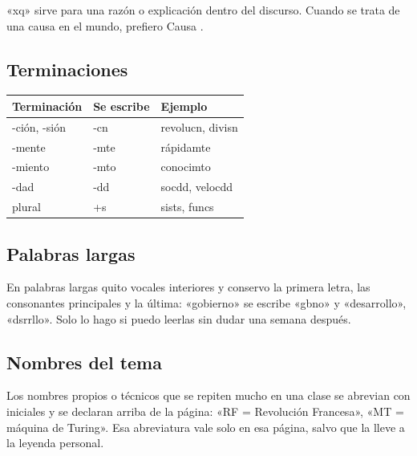 «xq» sirve para una razón o explicación dentro del discurso. Cuando se trata de
una causa en el mundo, prefiero Causa .

\subsection{Terminaciones}
\begin{center}
\begin{tabular}{@{}lll@{}}
\toprule Terminación & Se escribe & Ejemplo \\ \midrule
-ción, -sión & -cn & revolucn, divisn \\
-mente & -mte & rápidamte \\
-miento & -mto & conocimto \\
-dad & -dd & socdd, velocdd \\
plural & +s & sists, funcs \\
\bottomrule
\end{tabular}
\end{center}

\subsection{Palabras largas}
En palabras largas quito vocales interiores y conservo la primera letra, las
consonantes principales y la última: «gobierno» se escribe «gbno» y «desarrollo»,
«dsrrllo». Solo lo hago si puedo leerlas sin dudar una semana después.

\subsection{Nombres del tema}
Los nombres propios o técnicos que se repiten mucho en una clase se abrevian
con iniciales y se declaran arriba de la página: «RF = Revolución Francesa»,
«MT = máquina de Turing». Esa abreviatura vale solo en esa página, salvo que la
lleve a la leyenda personal.
